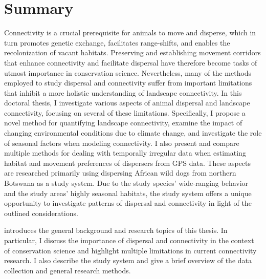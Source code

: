 \documentclass[abstract=on,twoside,10pt,a4paper,bibliography=totocnumbered]{report}
\begin{document}
\renewcommand{\bibname}{References}





\chapter*{Summary}

Connectivity is a crucial prerequisite for animals to move and disperse, which
in turn promotes genetic exchange, facilitates range-shifts, and enables the
recolonization of vacant habitats. Preserving and establishing movement
corridors that enhance connectivity and facilitate dispersal have therefore
become tasks of utmost importance in conservation science. Nevertheless, many of
the methods employed to study dispersal and connectivity suffer from important
limitations that inhibit a more holistic understanding of landscape
connectivity. In this doctoral thesis, I investigate various aspects of animal
dispersal and landscape connectivity, focusing on several of these limitations.
Specifically, I propose a novel method for quantifying landscape connectivity,
examine the impact of changing environmental conditions due to climate change,
and investigate the role of seasonal factors when modeling connectivity. I also
present and compare multiple methods for dealing with temporally irregular data
when estimating habitat and movement preferences of dispersers from GPS data.
These aspects are researched primarily using dispersing African wild dogs from
northern Botswana as a study system. Due to the study species' wide-ranging
behavior and the study areas' highly seasonal habitats, the study system offers
a unique opportunity to investigate patterns of dispersal and connectivity in
light of the outlined considerations.

 introduces the general background and research topics
of this thesis. In particular, I discuss the importance of dispersal and
connectivity in the context of conservation science and highlight multiple
limitations in current connectivity research. I also describe the study system
and give a brief overview of the data collection and general research methods.
\end{document}
